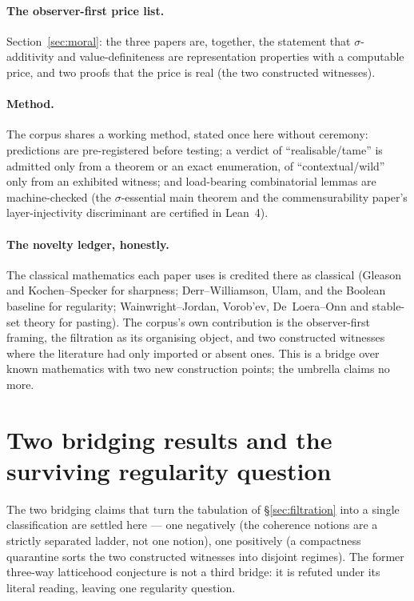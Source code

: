\paragraph{The observer-first price list.} Section~\ref{sec:moral}: the three
papers are, together, the statement that $\sigma$-additivity and
value-definiteness are representation properties with a computable price, and two
proofs that the price is real (the two constructed witnesses).

\paragraph{Method.} The corpus shares a working method, stated once here without
ceremony: predictions are pre-registered before testing; a verdict of
``realisable/tame'' is admitted only from a theorem or an exact enumeration, of
``contextual/wild'' only from an exhibited witness; and load-bearing
combinatorial lemmas are machine-checked (the $\sigma$-essential main theorem and
the commensurability paper's layer-injectivity discriminant are certified in
Lean~4).

\paragraph{The novelty ledger, honestly.} The classical mathematics each paper
uses is credited there as classical (Gleason and Kochen--Specker for sharpness;
Derr--Williamson, Ulam, and the Boolean baseline for regularity;
Wainwright--Jordan, Vorob'ev, De~Loera--Onn and stable-set theory for pasting).
The corpus's own contribution is the observer-first framing, the filtration as
its organising object, and two constructed witnesses where the literature had
only imported or absent ones. This is a bridge over known mathematics with two
new construction points; the umbrella claims no more.


\section{Two bridging results and the surviving regularity question}\label{sec:open}

The two bridging claims that turn the tabulation of \S\ref{sec:filtration} into a
single classification are settled here --- one negatively (the coherence notions
are a strictly separated ladder, not one notion), one positively (a compactness
quarantine sorts the two constructed witnesses into disjoint regimes). The
former three-way latticehood conjecture is not a third bridge: it is refuted
under its literal reading, leaving one regularity question.

